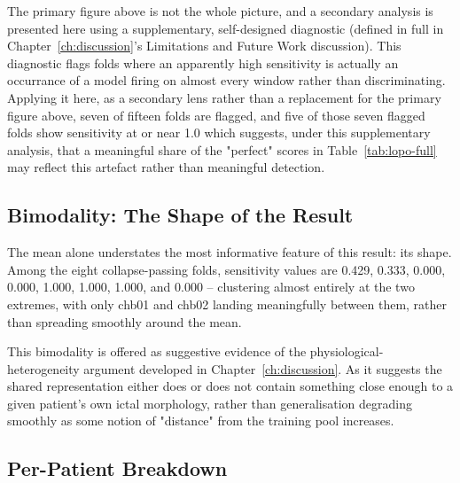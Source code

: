 The primary figure above is not the whole picture, and a secondary analysis is presented here using a supplementary, self-designed diagnostic (defined in full in Chapter~\ref{ch:discussion}'s Limitations and Future Work discussion). This diagnostic flags folds where an apparently high sensitivity is actually an occurrance of a model firing on almost every window rather than discriminating. Applying it here, as a secondary lens rather than a replacement for the primary figure above, seven of fifteen folds are flagged, and five of those seven flagged folds show sensitivity at or near 1.0 which suggests, under this supplementary analysis, that a meaningful share of the "perfect" scores in Table~\ref{tab:lopo-full} may reflect this artefact rather than meaningful detection. 

\subsection{Bimodality: The Shape of the Result}

The mean alone understates the most informative feature of this result: its shape. Among the eight collapse-passing folds, sensitivity values are 0.429, 0.333, 0.000, 0.000, 1.000, 1.000, 1.000, and 0.000 -- clustering almost entirely at the two extremes, with only chb01 and chb02 landing meaningfully between them, rather than spreading smoothly around the mean.


This bimodality is offered as suggestive evidence of the physiological-heterogeneity argument developed in Chapter~\ref{ch:discussion}. As it suggests the shared representation either does or does not contain something close enough to a given patient's own ictal morphology, rather than generalisation degrading smoothly as some notion of "distance" from the training pool increases.

\subsection{Per-Patient Breakdown}



